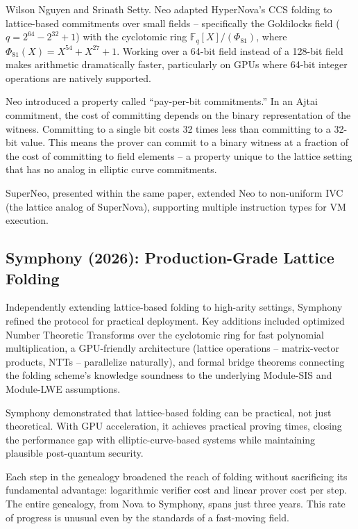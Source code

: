 \documentclass[
  11pt,
  openany]{report}
\begin{document}
Wilson Nguyen and Srinath Setty. Neo adapted HyperNova's CCS folding to
lattice-based commitments over small fields -- specifically the Goldilocks field
(\(q = 2^{64} - 2^{32} + 1\)) with the cyclotomic ring
\(\mathbb{F}_q[X]/(\Phi_{81})\), where \(\Phi_{81}(X) = X^{54} + X^{27} + 1\).
Working over a 64-bit field instead of a 128-bit field makes arithmetic
dramatically faster, particularly on GPUs where 64-bit integer operations are
natively supported.

Neo introduced a property called ``pay-per-bit commitments.'' In an Ajtai
commitment, the cost of committing depends on the binary representation of the
witness. Committing to a single bit costs 32 times less than committing to a
32-bit value. This means the prover can commit to a binary witness at a fraction
of the cost of committing to field elements -- a property unique to the lattice
setting that has no analog in elliptic curve commitments.

SuperNeo, presented within the same paper, extended Neo to non-uniform IVC (the
lattice analog of SuperNova), supporting multiple instruction types for VM
execution.

\subsection{Symphony (2026): Production-Grade Lattice
Folding}\label{symphony-2026-production-grade-lattice-folding}

Independently extending lattice-based folding to high-arity settings, Symphony
refined the protocol for practical deployment. Key additions included optimized
Number Theoretic Transforms over the cyclotomic ring for fast polynomial
multiplication, a GPU-friendly architecture (lattice operations -- matrix-vector
products, NTTs -- parallelize naturally), and formal bridge theorems connecting
the folding scheme's knowledge soundness to the underlying Module-SIS and
Module-LWE assumptions.

Symphony demonstrated that lattice-based folding can be practical, not just
theoretical. With GPU acceleration, it achieves practical proving times, closing
the performance gap with elliptic-curve-based systems while maintaining
plausible post-quantum security.

Each step in the genealogy broadened the reach of folding without sacrificing
its fundamental advantage: logarithmic verifier cost and linear prover cost per
step. The entire genealogy, from Nova to Symphony, spans just three years. This
rate of progress is unusual even by the standards of a fast-moving field.
\end{document}
